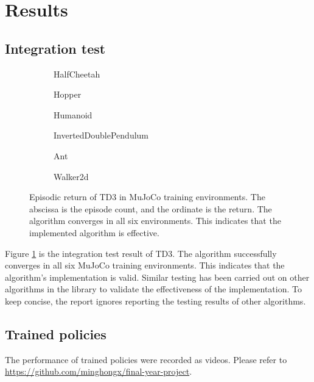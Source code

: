 \newpage
\section{Results} \label{sec:results}

\subsection{Integration test}

\begin{figure}[htbp]
\centering
\begin{subfigure}[b]{0.49\textwidth}
   \centering
   
   \caption{HalfCheetah}
\end{subfigure}
\begin{subfigure}[b]{0.49\textwidth}
   \centering
   
   \caption{Hopper}
\end{subfigure}
\begin{subfigure}[b]{0.49\textwidth}
   \centering
   
   \caption{Humanoid}
\end{subfigure}
\begin{subfigure}[b]{0.49\textwidth}
   \centering
   
   \caption{InvertedDoublePendulum}
\end{subfigure}
\begin{subfigure}[b]{0.49\textwidth}
   \centering
   
   \caption{Ant}
\end{subfigure}
\begin{subfigure}[b]{0.49\textwidth}
   \centering
   
   \caption{Walker2d}
\end{subfigure}
\caption{Episodic return of TD3 in MuJoCo training environments. The abscissa is the episode count, and the ordinate is the return. The algorithm converges in all six environments. This indicates that the implemented algorithm is effective.}
\label{fig:td3_test}
\end{figure}

Figure \ref{fig:td3_test} is the integration test result of TD3. The algorithm successfully converges in all six MuJoCo training environments. This indicates that the algorithm's implementation is valid. Similar testing has been carried out on other algorithms in the library to validate the effectiveness of the implementation. To keep concise, the report ignores reporting the testing results of other algorithms.

\subsection{Trained policies}

The performance of trained policies were recorded as videos. Please refer to \url{https://github.com/minghongx/final-year-project}.
